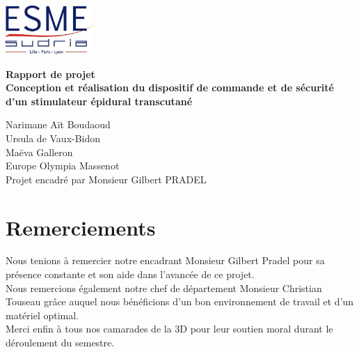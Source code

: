 \documentclass{report}
\begin{document}
\begin{titlepage}

\enlargethispage{2cm}


 \includegraphics[height=70]{./Schema/esme-logo.jpg}

\begin{center}
\vspace*{5cm}
\Huge\bf{Rapport de projet} \\ 
\vspace*{1.5cm}
\LARGE{Conception et r\'{e}alisation du dispositif de commande et de s\'{e}curit\'{e} d'un stimulateur \'{e}pidural transcutan\'{e}}

\end{center}

\vspace*{7cm}
\begin{center}
\Large{Narimane A\"{i}t Boudaoud \\Ursula de Vaux-Bidon \\Ma\"{e}va Galleron \\Europe Olympia Massenot \\}
\vspace*{1cm}
\Large{Projet encadr\'{e} par Monsieur Gilbert PRADEL}
\end{center}


\end{titlepage}

\chapter*{Remerciements}
\large
Nous tenions \`{a} remercier notre encadrant Monsieur Gilbert Pradel pour sa pr\'{e}sence constante et son aide dans l'avanc\'{e}e de ce projet. \\
Nous remercions \'{e}galement notre chef de d\'{e}partement Monsieur Christian Touseau gr\^{a}ce auquel nous b\'{e}n\'{e}ficions d’un bon environnement de travail et d’un mat\'{e}riel optimal. \\
Merci enfin \`{a} tous nos camarades de la 3D pour leur soutien moral durant le d\'{e}roulement du semestre. 
\end{document}
